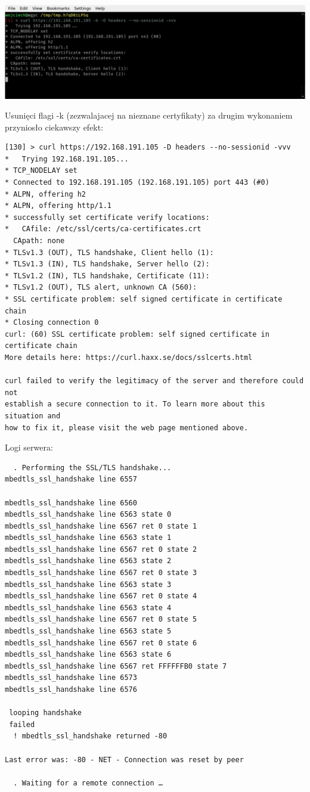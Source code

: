 \includegraphics[width=\linewidth]{./images/2.png}

Usunięci flagi -k (zezwalajacej na nieznane certyfikaty) za drugim wykonaniem przyniosło ciekawszy efekt:

\begin{verbatim}
[130] > curl https://192.168.191.105 -D headers --no-sessionid -vvv
*   Trying 192.168.191.105...
* TCP_NODELAY set
* Connected to 192.168.191.105 (192.168.191.105) port 443 (#0)
* ALPN, offering h2
* ALPN, offering http/1.1
* successfully set certificate verify locations:
*   CAfile: /etc/ssl/certs/ca-certificates.crt
  CApath: none
* TLSv1.3 (OUT), TLS handshake, Client hello (1):
* TLSv1.3 (IN), TLS handshake, Server hello (2):
* TLSv1.2 (IN), TLS handshake, Certificate (11):
* TLSv1.2 (OUT), TLS alert, unknown CA (560):
* SSL certificate problem: self signed certificate in certificate chain
* Closing connection 0
curl: (60) SSL certificate problem: self signed certificate in certificate chain
More details here: https://curl.haxx.se/docs/sslcerts.html

curl failed to verify the legitimacy of the server and therefore could not
establish a secure connection to it. To learn more about this situation and
how to fix it, please visit the web page mentioned above.
\end{verbatim}

Logi serwera:
\begin{verbatim}
  . Performing the SSL/TLS handshake...
mbedtls_ssl_handshake line 6557

mbedtls_ssl_handshake line 6560
mbedtls_ssl_handshake line 6563 state 0
mbedtls_ssl_handshake line 6567 ret 0 state 1
mbedtls_ssl_handshake line 6563 state 1
mbedtls_ssl_handshake line 6567 ret 0 state 2
mbedtls_ssl_handshake line 6563 state 2
mbedtls_ssl_handshake line 6567 ret 0 state 3
mbedtls_ssl_handshake line 6563 state 3
mbedtls_ssl_handshake line 6567 ret 0 state 4
mbedtls_ssl_handshake line 6563 state 4
mbedtls_ssl_handshake line 6567 ret 0 state 5
mbedtls_ssl_handshake line 6563 state 5
mbedtls_ssl_handshake line 6567 ret 0 state 6
mbedtls_ssl_handshake line 6563 state 6
mbedtls_ssl_handshake line 6567 ret FFFFFFB0 state 7
mbedtls_ssl_handshake line 6573
mbedtls_ssl_handshake line 6576

 looping handshake
 failed
  ! mbedtls_ssl_handshake returned -80

Last error was: -80 - NET - Connection was reset by peer

  . Waiting for a remote connection …
\end{verbatim}

